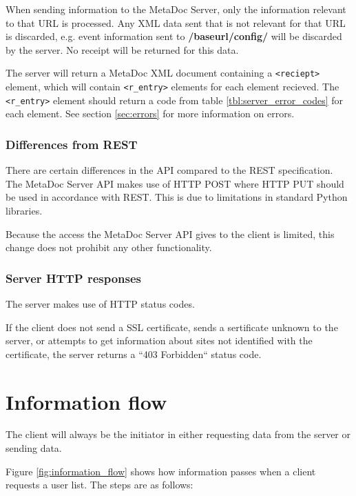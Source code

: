 \documentclass[titlepage, a4paper,10pt]{article}
\begin{document}
When sending information to the MetaDoc Server, only the information relevant to 
that URL is processed. Any XML data sent that is not relevant for that URL is 
discarded, e.g. event information sent to \textbf{/baseurl/config/} will be 
discarded by the server. No receipt will be returned for this data.  

The server will return a MetaDoc XML document containing a \texttt{<reciept>} 
element, which will contain \texttt{<r\_entry>} elements for each element 
recieved. The \texttt{<r\_entry>} element should return a code from table 
\ref{tbl:server_error_codes} for each element. See section \ref{sec:errors} for 
more information on errors. 

\subsubsection{Differences from REST}

There are certain differences in the API compared to the REST specification. The 
MetaDoc Server API makes use of HTTP POST where HTTP PUT should be used in 
accordance with REST. This is due to limitations in standard Python libraries.

Because the access the MetaDoc Server API gives to the client is limited, this 
change does not prohibit any other functionality. 

\subsubsection{Server HTTP responses}

The server makes use of HTTP status codes.

If the client does not send a SSL certificate, sends a sertificate unknown to 
the server, or attempts to get information about sites not identified with the
certificate, the server returns a ``403 Forbidden`` status code.

\newpage
\section{Information flow}

The client will always be the initiator in either requesting data from the
server or sending data. 

Figure \ref{fig:information_flow} shows how information passes when a client
requests a user list. The steps are as follows:
\end{document}
